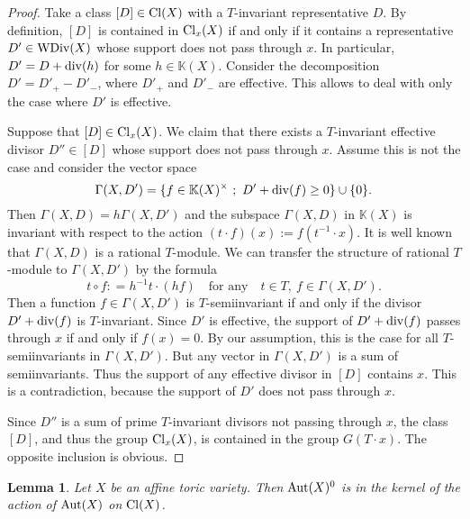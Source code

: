 \documentclass[12pt,a4paper]{amsart}
\theoremstyle{plain}
\newtheorem{lemma}{Lemma}
\theoremstyle{definition}
\begin{document}
\begin{proof}
Take a class $[D]\in{\mathop{\rm Cl}}(X)$ with a $T$-invariant representative $D$.
By definition, $[D]$ is contained in ${\mathop{\rm Cl}}_x(X)$ if and only if it contains
a representative $D'\in{\mathop{\rm WDiv}}(X)$ whose support does not pass through $x$.
In particular, $D' = D + {\mathop{\rm div}}(h)$ for some $h\in{{\mathbb K}}(X)$.
Consider the decomposition $D'=D'_+-D'_-$, where $D'_+$ and $D'_-$ are effective.
This allows to deal with only the case where $D'$ is effective.

Suppose that $[D]\in{\mathop{\rm Cl}}_x(X)$.
We claim that there exists a $T$-invariant effective divisor $D''\in [D]$
whose support does not pass through $x$. Assume this is not the case and
consider the vector space
$$
\Gamma(X, D') = \{ f\in{{\mathbb K}}(X)^{\times} \ ; \ D' + {\mathop{\rm div}}(f) \ge 0\} \cup \{0\}.
$$
Then $\Gamma(X,D) = h\Gamma(X,D')$ and the subspace $\Gamma(X,D)$ in ${{\mathbb K}}(X)$
is invariant with respect to the action $(t\cdot f)(x):=f(t^{-1}\cdot x)$.
It is well known that $\Gamma(X,D)$ is a rational $T$-module. We can transfer
the structure of rational $T$-module to $\Gamma(X,D')$ by the formula
$$
t\circ f : = h^{-1} t\cdot (hf) \quad \text{for \ any} \quad t\in T, \ f\in\Gamma(X,D').
$$
Then a function $f\in\Gamma(X,D')$ is $T$-semiinvariant if and only if the divisor
$D'+{\mathop{\rm div}}(f)$ is $T$-invariant. Since $D'$ is effective, the support of $D'+{\mathop{\rm div}}(f)$
passes through $x$ if and only if $f(x)=0$. By our assumption, this is the case for
all $T$-semiinvariants in $\Gamma(X,D')$. But any vector in $\Gamma(X,D')$
is a sum of semiinvariants. Thus the support of any effective divisor in $[D]$
contains $x$. This is a contradiction, because the support of $D'$ does not
pass through $x$.

Since $D''$ is a sum of prime $T$-invariant divisors not passing through $x$,
the class $[D]$, and thus the group ${\mathop{\rm Cl}}_x(X)$, is contained in the group
$G(T\cdot x)$. The opposite inclusion is obvious.
\end{proof}

\begin{lemma}
Let $X$ be an affine toric variety.
Then ${\mathop{\rm Aut}}(X)^0$ is in the kernel of the action of ${\mathop{\rm Aut}}(X)$ on ${\mathop{\rm Cl}}(X)$.
\end{lemma}
\end{document}
